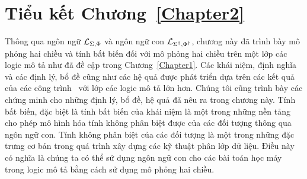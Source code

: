\section*{Tiểu kết Chương~\ref{Chapter2}}
\label{sec:Chap2.Summary}
Thông qua ngôn ngữ $\mathcal{L}_{\Sigma,\Phi}$ và ngôn ngữ con $\mathcal{L}_{\Sigma^\dag,\Phi^\dag}$, chương này đã trình bày mô phỏng hai chiều và tính bất biến đối với mô phỏng hai chiều trên một lớp các logic mô tả như đã đề cập trong Chương~\ref{Chapter1}. Các khái niệm, định nghĩa và các định lý, bổ đề cũng như các hệ quả được phát triển dựa trên các kết quả của các công trình~\cite{Divroodi2011B,Nguyen2013} với lớp các logic mô tả lớn hơn. Chúng tôi cũng trình bày các chứng minh cho những định lý, bổ đề, hệ quả đã nêu ra trong chương này. Tính bất biến, đặc biệt là tính bất biến của khái niệm là một trong những nền tảng cho phép mô hình hóa tính không phân biệt được của các đối tượng thông qua ngôn ngữ con. Tính không phân biệt của các đối tượng là một trong những đặc trưng cơ bản trong quá trình xây dựng các kỹ thuật phân lớp dữ liệu. Điều này có nghĩa là chúng ta có thể sử dụng ngôn ngữ con cho các bài toán học máy trong logic mô tả bằng cách sử dụng mô phỏng hai chiều.
\cleardoublepage